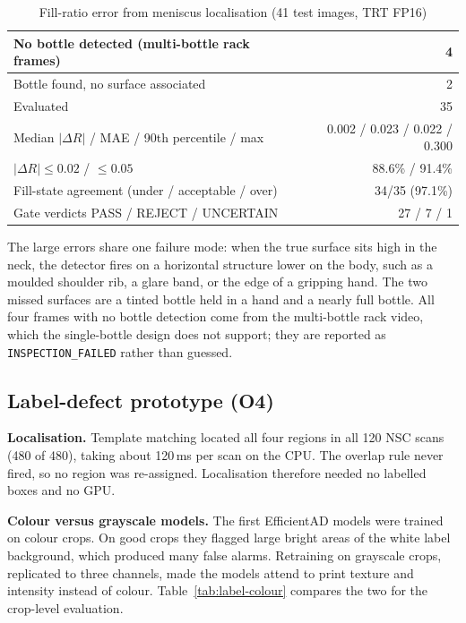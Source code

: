 \begin{table}[htbp]
\centering
\caption{Fill-ratio error from meniscus localisation (41 test images, TRT FP16)}
\label{tab:fillerr}
\begin{tabular}{|l|r|}
\hline
No bottle detected (multi-bottle rack frames) & 4 \\ \hline
Bottle found, no surface associated & 2 \\ \hline
Evaluated & 35 \\ \hline
Median $|\Delta R|$ / MAE / 90th percentile / max & 0.002 / 0.023 / 0.022 / 0.300 \\ \hline
$|\Delta R|\leq0.02$ / $\leq0.05$ & 88.6\% / 91.4\% \\ \hline
Fill-state agreement (under / acceptable / over) & 34/35 (97.1\%) \\ \hline
Gate verdicts PASS / REJECT / UNCERTAIN & 27 / 7 / 1 \\ \hline
\end{tabular}
\end{table}

The large errors share one failure mode: when the true surface sits high in the neck, the detector fires on a horizontal structure lower on the body, such as a moulded shoulder rib, a glare band, or the edge of a gripping hand. The two missed surfaces are a tinted bottle held in a hand and a nearly full bottle. All four frames with no bottle detection come from the multi-bottle rack video, which the single-bottle design does not support; they are reported as \texttt{INSPECTION\_FAILED} rather than guessed.

\subsection{Label-defect prototype (O4)}
\label{sec:res-label}

\noindent\textbf{Localisation.} Template matching located all four regions in all 120 NSC scans (480 of 480), taking about 120\,ms per scan on the CPU. The overlap rule never fired, so no region was re-assigned. Localisation therefore needed no labelled boxes and no GPU.

\noindent\textbf{Colour versus grayscale models.} The first EfficientAD models were trained on colour crops. On good crops they flagged large bright areas of the white label background, which produced many false alarms. Retraining on grayscale crops, replicated to three channels, made the models attend to print texture and intensity instead of colour. Table~\ref{tab:label-colour} compares the two for the crop-level evaluation.


